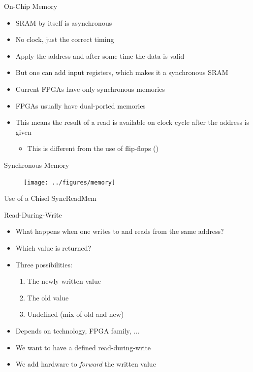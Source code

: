 \begin{frame}[fragile]{On-Chip Memory}
\begin{itemize}
\item SRAM by itself is asynchronous
\item No clock, just the correct timing
\item Apply the address and after some time the data is valid
\item But one can add input registers, which makes it a synchronous SRAM
\item Current FPGAs have only synchronous memories
\item FPGAs usually have dual-ported memories
\item This means the result of a read is available on clock cycle after the address is given
\begin{itemize}
\item This is different from the use of flip-flops ()
\end{itemize}
\end{itemize}
\end{frame}

\begin{frame}[fragile]{Synchronous Memory}
\begin{figure}
  \texttt{[image: ../figures/memory]}
\end{figure}
\end{frame}

\begin{frame}[fragile]{Use of a Chisel SyncReadMem}
\end{frame}

\begin{frame}[fragile]{Read-During-Write}
\begin{itemize}
\item What happens when one writes to and reads from the same address?
\item Which value is returned?
\item Three possibilities:
\begin{enumerate}
\item The newly written value
\item The old value
\item Undefined (mix of old and new)
\end{enumerate}
\item Depends on technology, FPGA family, ...
\item We want to have a defined read-during-write
\item We add hardware to \emph{forward} the written value
\end{itemize}
\end{frame}

